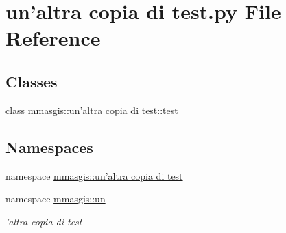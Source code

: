 \hypertarget{un'altra_01copia_01di_01test_8py}{
\section{un'altra copia di test.py File Reference}
\label{un'altra_01copia_01di_01test_8py}
}
\subsection*{Classes}
\begin{DoxyCompactItemize}
\item 
class \hyperlink{classmmasgis_1_1un'altra_01copia_01di_01test_1_1test}{mmasgis::un'altra copia di test::test}
\end{DoxyCompactItemize}
\subsection*{Namespaces}
\begin{DoxyCompactItemize}
\item 
namespace \hyperlink{namespacemmasgis_1_1un'altra_01copia_01di_01test}{mmasgis::un'altra copia di test}
\item 
namespace \hyperlink{namespacemmasgis_1_1un}{mmasgis::un}


\begin{DoxyCompactList}\small\item\em 'altra copia di test \item\end{DoxyCompactList}

\end{DoxyCompactItemize}
